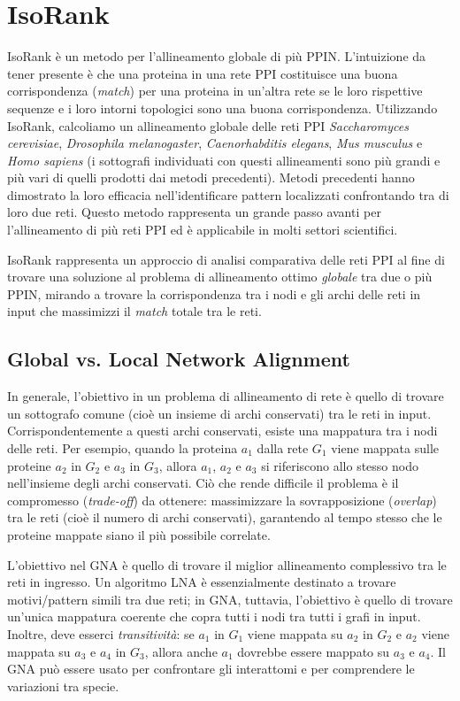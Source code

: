 \documentclass[11pt]{article}
\begin{document}
\pagebreak
\section{IsoRank}
IsoRank è un metodo per l'allineamento globale di più PPIN. L'intuizione da tener presente è che una proteina in una rete PPI costituisce una buona corrispondenza (\textit{match}) per una proteina in un'altra rete se le loro rispettive sequenze e i loro intorni topologici sono una buona corrispondenza. Utilizzando IsoRank, calcoliamo un allineamento globale delle reti PPI \textit{Saccharomyces cerevisiae}, \textit{Drosophila melanogaster}, \textit{Caenorhabditis elegans}, \textit{Mus musculus} e \textit{Homo sapiens} (i sottografi individuati con questi allineamenti sono più grandi e più vari di quelli prodotti dai metodi precedenti). Metodi precedenti hanno dimostrato la loro efficacia nell'identificare pattern localizzati confrontando tra di loro due reti. Questo metodo rappresenta un grande passo avanti per l'allineamento di più reti PPI ed è applicabile in molti settori scientifici.

IsoRank rappresenta un approccio di analisi comparativa delle reti PPI al fine di trovare una soluzione al problema di allineamento ottimo \textit{globale} tra due o più PPIN, mirando a trovare la corrispondenza tra i nodi e gli archi delle reti in input che massimizzi il \textit{match} totale tra le reti.

\subsection{Global vs. Local Network Alignment}
In generale, l'obiettivo in un problema di allineamento di rete è quello di trovare un sottografo comune (cioè un insieme di archi conservati) tra le reti in input. Corrispondentemente a questi archi conservati, esiste una mappatura tra i nodi delle reti. Per esempio, quando la proteina $a_1$ dalla rete $G_1$ viene mappata sulle proteine $a_2$ in $G_2$ e $a_3$ in $G_3$, allora $a_1$, $a_2$ e $a_3$ si riferiscono allo stesso nodo nell'insieme degli archi conservati. Ciò che rende difficile il problema è il compromesso (\textit{trade-off}) da ottenere: massimizzare la sovrapposizione (\textit{overlap}) tra le reti (cioè il numero di archi conservati), garantendo al tempo stesso che le proteine mappate siano il più possibile correlate.


L'obiettivo nel GNA è quello di trovare il miglior allineamento complessivo tra le reti in ingresso. Un algoritmo LNA è essenzialmente destinato a trovare motivi/pattern simili tra due reti; in GNA, tuttavia, l'obiettivo è quello di trovare un'unica mappatura coerente che copra tutti i nodi tra tutti i grafi in input. Inoltre, deve esserci \textit{transitività}: se $a_1$ in $G_1$ viene mappata su $a_2$ in $G_2$ e $a_2$ viene mappata su $a_3$ e $a_4$ in $G_3$, allora anche $a_1$ dovrebbe essere mappato su $a_3$ e $a_4$. Il GNA può essere usato per confrontare gli interattomi e per comprendere le variazioni tra specie.
\end{document}
